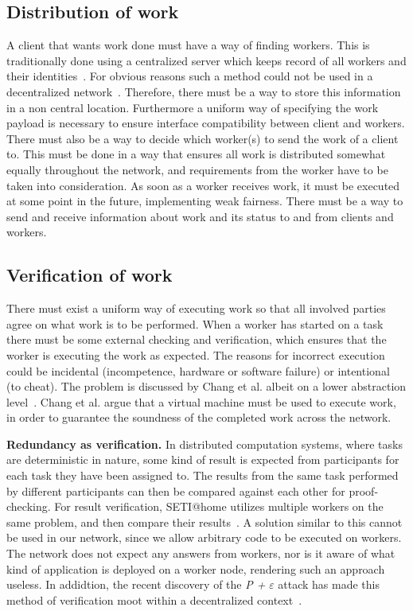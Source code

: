 \subsection{Distribution of work}
A client that wants work done must have a way of finding workers. This is traditionally done using a centralized server which keeps record of all workers and their identities~\cite{anderson:2005}\cite{sarmenta:2002}. For obvious reasons such a method could not be used in a decentralized network~\cite{baran}. Therefore, there must be a way to store this information in a non central location. Furthermore a uniform way of specifying the work payload is necessary to ensure interface compatibility between client and workers. There must also be a way to decide which worker(s) to send the work of a client to. This must be done in a way that ensures all work is distributed somewhat equally throughout the network, and requirements from the worker have to be taken into consideration. As soon as a worker receives work, it must be executed at some point in the future, implementing weak fairness. There must be a way to send and receive information about work and its status to and from clients and workers.

\subsection{Verification of work}
There must exist a uniform way of executing work so that all involved parties agree on what work is to be performed. When a worker has started on a task there must be some external checking and verification, which ensures that the worker is executing the work as expected. The reasons for incorrect execution could be incidental (incompetence, hardware or software failure) or intentional (to cheat). The problem is discussed by Chang et al. albeit on a lower abstraction level~\cite{chang:2002}. Chang et al. argue that a virtual machine must be used to execute work, in order to guarantee the soundness of the completed work across the network.

\textbf{Redundancy as verification.} In distributed computation systems, where tasks are deterministic in nature, some kind of result is expected from participants for each task they have been assigned to. The results from the same task performed by different participants can then be compared against each other for proof-checking. For result verification, SETI@home utilizes multiple workers on the same problem, and then compare their results~\cite{korpela:2001}. A solution similar to this cannot be used in our network, since we allow arbitrary code to be executed on workers. The network does not expect any answers from workers, nor is it aware of what kind of application is deployed on a worker node, rendering such an approach useless. In addidtion, the recent discovery of the \emph{P +} $\varepsilon$ attack has made this method of verification moot within a decentralized context~\cite{buterin:2015}.

